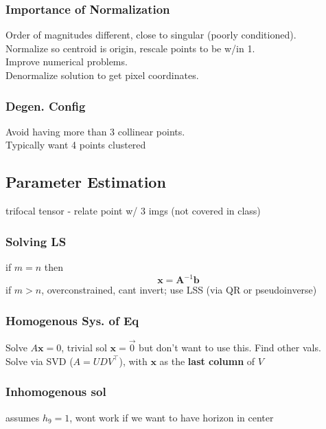 \documentclass{article}
\begin{document}
\subsubsection{Importance of Normalization}
Order of magnitudes different, close to singular (poorly conditioned).\\
Normalize so centroid is origin, rescale points to be w/in 1.
\\
Improve numerical problems. \\
Denormalize solution to get pixel coordinates.

\subsubsection{Degen. Config}
Avoid having more than 3 collinear points. \\
Typically want 4 points clustered


\subsection{Parameter Estimation}
trifocal tensor - relate point w/ 3 imgs (not covered in class)

\subsubsection{Solving LS}
if $m=n$ then
\[
    \mathbf x = \mathbf A^{-1} \mathbf b
\]
\noindent
if $m > n$, overconstrained, cant invert; use LSS (via QR or pseudoinverse)

\subsubsection{Homogenous Sys. of Eq}
Solve $A\mathbf x = 0$, trivial sol $\mathbf x=\vec 0$ but don't want to use this. Find other vals.
\\
Solve via SVD ($A = UDV^\top$), with $\mathbf x$ as the \textbf{last column} of $V$



\subsubsection{Inhomogenous sol}
assumes $h_9 = 1$, wont work if we want to have horizon in center 
\end{document}

